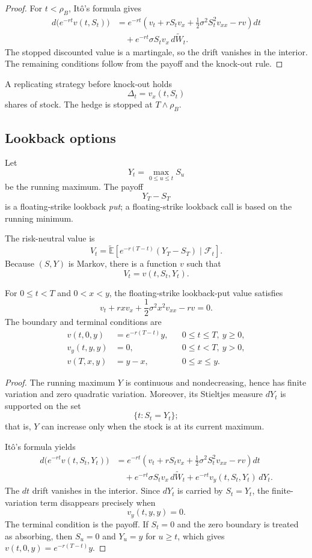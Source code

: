 \begin{proof}
For $t<\rho_B$, It\^o's formula gives
\[
\begin{aligned}
d\bigl(e^{-rt}v(t,S_t)\bigr)
&=e^{-rt}
 \left(v_t+rS_tv_x+\frac12\sigma^2S_t^2v_{xx}-rv\right)dt\\
&\quad+e^{-rt}\sigma S_tv_x\,d\widetilde W_t.
\end{aligned}
\]
The stopped discounted value is a martingale, so the drift vanishes in the interior. The remaining conditions follow from the payoff and the knock-out rule.
\end{proof}

A replicating strategy before knock-out holds
\[
\Delta_t=v_x(t,S_t)
\]
shares of stock. The hedge is stopped at $T\wedge\rho_B$.

\subsection{Lookback options}

Let
\[
Y_t=\max_{0\leq u\leq t}S_u
\]
be the running maximum. The payoff
\[
Y_T-S_T
\]
is a floating-strike lookback \emph{put}; a floating-strike lookback call is based on the running minimum.

The risk-neutral value is
\[
V_t
=\widetilde{\mathbb{E}}\!\left[
 e^{-r(T-t)}(Y_T-S_T)
 \mid\mathcal{F}_t
\right].
\]
Because $(S,Y)$ is Markov, there is a function $v$ such that
\[
V_t=v(t,S_t,Y_t).
\]

\begin{thm}
For $0\leq t<T$ and $0<x<y$, the floating-strike lookback-put value satisfies
\[
v_t+rxv_x+\frac12\sigma^2x^2v_{xx}-rv=0.
\]
The boundary and terminal conditions are
\[
\begin{aligned}
v(t,0,y)&=e^{-r(T-t)}y,
    &&0\leq t\leq T,\ y\geq0,\\
v_y(t,y,y)&=0,
    &&0\leq t<T,\ y>0,\\
v(T,x,y)&=y-x,
    &&0\leq x\leq y.
\end{aligned}
\]
\end{thm}

\begin{proof}
The running maximum $Y$ is continuous and nondecreasing, hence has finite variation and zero quadratic variation. Moreover, its Stieltjes measure $dY_t$ is supported on the set
\[
\{t:S_t=Y_t\};
\]
that is, $Y$ can increase only when the stock is at its current maximum.

It\^o's formula yields
\[
\begin{aligned}
d\bigl(e^{-rt}v(t,S_t,Y_t)\bigr)
&=e^{-rt}
 \left(v_t+rS_tv_x+\frac12\sigma^2S_t^2v_{xx}-rv\right)dt\\
&\quad+e^{-rt}\sigma S_tv_x\,d\widetilde W_t
 +e^{-rt}v_y(t,S_t,Y_t)\,dY_t.
\end{aligned}
\]
The $dt$ drift vanishes in the interior. Since $dY_t$ is carried by $S_t=Y_t$, the finite-variation term disappears precisely when
\[
v_y(t,y,y)=0.
\]
The terminal condition is the payoff. If $S_t=0$ and the zero boundary is treated as absorbing, then $S_u=0$ and $Y_u=y$ for $u\geq t$, which gives $v(t,0,y)=e^{-r(T-t)}y$.
\end{proof}


